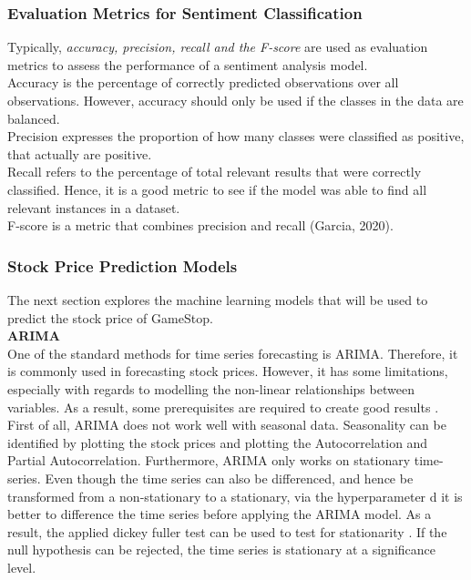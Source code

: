\documentclass[11pt, a4paper]{article}
\begin{document}
\subsubsection{Evaluation Metrics for Sentiment Classification}
Typically, \emph{accuracy, precision, recall and the F-score} are used as evaluation metrics to assess the performance of a sentiment analysis model. \\
Accuracy is the percentage of correctly predicted observations over all observations. However, accuracy should only be used if the classes in the data are balanced.\\
Precision expresses the proportion of how many classes were classified as positive, that actually are positive.\\
Recall refers to the percentage of total relevant results that were correctly classified. Hence, it is a good metric to see if the model was able to find all relevant instances in a dataset.\\
F-score is a metric that combines precision and recall (Garcia, 2020).


\subsubsection{Stock Price Prediction Models}
The next section explores the machine learning models that will be used to predict the stock price of GameStop. \\

\noindent\textbf{ARIMA}\\
One of the standard methods for time series forecasting is ARIMA. Therefore, it is commonly used in forecasting stock prices.
However, it has some limitations, especially with regards to modelling the non-linear relationships between variables. As a result,
some prerequisites are required to create good results \citep{sima2018timeseries}.
First of all, ARIMA does not work well with seasonal data. Seasonality can be identified by plotting the stock prices and plotting
the Autocorrelation and Partial Autocorrelation.
Furthermore, ARIMA only works on stationary time-series. Even though the time series can also be differenced, and hence be transformed from
a non-stationary to a stationary, via the hyperparameter d it is better to difference the time series before applying the ARIMA model.
As a result, the applied dickey fuller test can be used to test for stationarity \citep{jain2017ASO}. If the null hypothesis can be rejected, the time series is stationary at a significance level. \\
\end{document}
